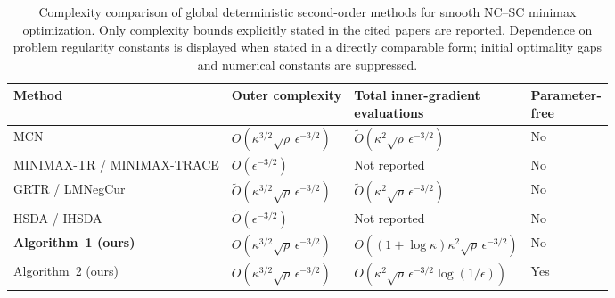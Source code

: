 \begin{table}[t]
\centering
\caption{
Complexity comparison of global deterministic second-order methods
for smooth NC--SC minimax optimization. Only complexity bounds
explicitly stated in the cited papers are reported. Dependence on
problem regularity constants is displayed when stated in a directly
comparable form; initial optimality gaps and numerical constants are
suppressed.
}
\label{tab:ncsc-complexity}

\small
\renewcommand{\arraystretch}{1.18}
\setlength{\tabcolsep}{3pt}

\begin{tabularx}{\textwidth}{@{}
    >{\raggedright\arraybackslash}X
    >{\centering\arraybackslash}p{}
    >{\centering\arraybackslash}p{}
    >{\centering\arraybackslash}p{}
@{}}
\toprule
Method
& Outer complexity
& \shortstack[c]{Total inner-gradient\\evaluations}
& \shortstack[c]{Parameter-\\free}
\\
\midrule

MCN \citep{luo2022finding}
&
$O\!\left(
\kappa^{3/2}\sqrt{\rho}\,
\epsilon^{-3/2}
\right)$
&
$\widetilde O\!\left(
\kappa^2\sqrt{\rho}\,
\epsilon^{-3/2}
\right)$
&
No
\\[1mm]

MINIMAX-TR / MINIMAX-TRACE
\newline \citep{yao2025trust}
&
$O(\epsilon^{-3/2})$
&
Not reported
&
No
\\[1mm]

GRTR / LMNegCur
\newline \citep{wang2025gradient}
&
$\widetilde O\!\left(
\kappa^{3/2}\sqrt{\rho}\,
\epsilon^{-3/2}
\right)$
&
$\widetilde O\!\left(
\kappa^2\sqrt{\rho}\,
\epsilon^{-3/2}
\right)$
&
No
\\[1mm]

HSDA / IHSDA
\newline \citep{chen2026hsda}
&
$\widetilde O(\epsilon^{-3/2})$
&
Not reported
&
No
\\

\midrule

\textbf{Algorithm~1 (ours)}
&
$O\!\left(
\kappa^{3/2}\sqrt{\rho}\,
\epsilon^{-3/2}
\right)$
&
$O\!\left(
(1+\log\kappa)\kappa^2\sqrt{\rho}\,
\epsilon^{-3/2}
\right)$
&
No
\\[1mm]

Algorithm~2 (ours)
&
$O\!\left(
\kappa^{3/2}\sqrt{\rho}\,
\epsilon^{-3/2}
\right)$
&
$O\!\left(
\kappa^2\sqrt{\rho}\,
\epsilon^{-3/2}\log(1/\epsilon)
\right)$
&
Yes
\\[1mm]


\end{tabularx}
\end{table}
